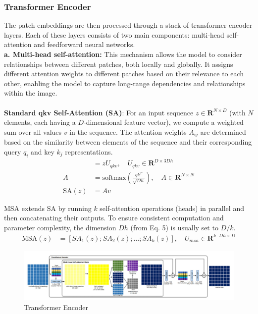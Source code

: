 \subsubsection{Transformer Encoder}
The patch embeddings are then processed through a stack of transformer encoder layers. Each of these layers consists of two main components: multi-head self-attention and feedforward neural networks.
\\


\noindent \textbf{a. Multi-head self-attention:} This mechanism allows the model to consider relationships between different patches, both locally and globally. It assigns different attention weights to different patches based on their relevance to each other, enabling the model to capture long-range dependencies and relationships within the image. \\
\\
\noindent \textbf{Standard qkv Self-Attention (SA)}:
For an input sequence $z \in \mathbf{R}^{N \times D}$ (with $N$ elements, each having a $D$-dimensional feature vector), we compute a weighted sum over all values $v$ in the sequence. The attention weights $A_{ij}$ are determined based on the similarity between elements of the sequence and their corresponding query $q_i$ and key $k_j$ representations.
\begin{align}
    [q, k, v]    & = zU_{qkv}, \quad U_{qkv} \in \mathbf{R}^{D \times 3Dh} \label{eq:qkv}                                               \\
    A            & = \text{softmax}\left(\frac{qk^T}{\sqrt{Dh}}\right), \quad A \in \mathbf{R}^{N \times N} \label{eq:attentionweights} \\
    \text{SA}(z) & = Av \label{eq:selfattention}
\end{align}

MSA extends SA by running $k$ self-attention operations (heads) in parallel and then concatenating their outputs. To ensure consistent computation and parameter complexity, the dimension $Dh$ (from Eq. 5) is usually set to $D/k$.
\begin{align}
    \text{MSA}(z) & = [SA_1(z); SA_2(z); \ldots ; SA_k(z)], \quad U_{msa} \in \mathbf{R}^{k \cdot Dh \times D} \label{eq:multiheadselfattention}
\end{align}

\begin{figure}[htbp]
    \centering
    \includegraphics[width=6in]{img/encoderdetails.jpg}
    \caption{{Transformer Encoder}}
\end{figure}

